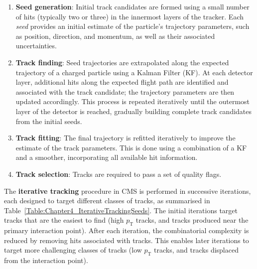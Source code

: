 \begin{enumerate}
    \item \textbf{Seed generation}: Initial track candidates are formed using a small number of hits (typically two or three) in the innermost layers of the tracker. Each \textit{seed} provides an initial estimate of the particle's trajectory parameters, such as position, direction, and momentum, as well as their associated uncertainties. 
    \item \textbf{Track finding}: Seed trajectories are extrapolated along the expected trajectory of a charged particle using a Kalman Filter (KF). At each detector layer, additional hits along the expected flight path are identified and associated with the track candidate; the trajectory parameters are then updated accordingly. This process is repeated iteratively until the outermost layer of the detector is reached, gradually building complete track candidates from the initial seeds.
    \item \textbf{Track fitting}: The final trajectory is refitted iteratively to improve the estimate of the track parameters. This is done using a combination of a KF and a smoother, incorporating all available hit information.
    \item \textbf{Track selection}: Tracks are required to pass a set of quality flags.
\end{enumerate}

The \textbf{iterative tracking} procedure in CMS is performed in successive iterations, each designed to target different classes of tracks, as summarised in Table~\ref{Table:Chapter4_IterativeTrackingSeeds}. The initial iterations target tracks that are the easiest to find (\eg high $p_\mathrm{T}$ tracks, and tracks produced near the primary interaction point). After each iteration, the combinatorial complexity is reduced by removing hits associated with tracks. This enables later iterations to target more challenging classes of tracks (\eg low $p_\mathrm{T}$ tracks, and tracks displaced from the interaction point). 

